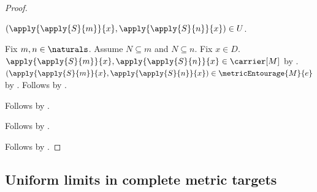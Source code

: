 \begin{proof}
\begin{subproof}
\begin{subproof}
                    $(\apply{\apply{S}{m}}{x},
                     \apply{\apply{S}{n}}{x})\in U$.
            \begin{subproof}
                Fix $m,n\in\naturals$.
                Assume $N\subseteq m$ and $N\subseteq n$.
                Fix $x\in D$.
                $\apply{\apply{S}{m}}{x},
                    \apply{\apply{S}{n}}{x}\in\carrier[M]$
                    by .
                $(\apply{\apply{S}{m}}{x},
                 \apply{\apply{S}{n}}{x})\in\metricEntourage{M}{e}$
                    by .
                Follows by .
            \end{subproof}
            Follows by \auto.
        \end{subproof}
        Follows by .
    \end{subproof}
    Follows by \auto.
\end{proof}

\subsection{Uniform limits in complete metric targets}

